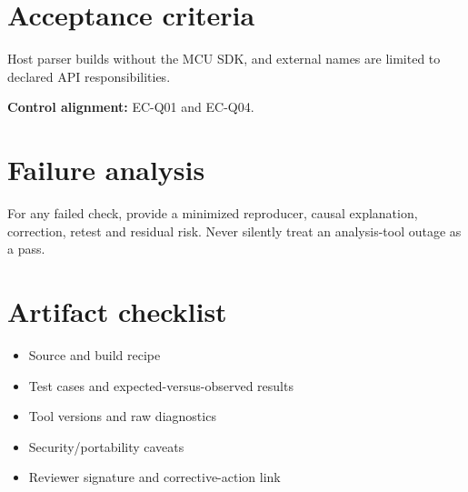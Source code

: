 \documentclass[10pt,letterpaper]{article}
\begin{document}
\section{Acceptance criteria}
Host parser builds without the MCU SDK, and external names are limited to declared API responsibilities.

\textbf{Control alignment:} EC-Q01 and EC-Q04.
\section{Failure analysis}
For any failed check, provide a minimized reproducer, causal explanation, correction, retest and residual risk. Never silently treat an analysis-tool outage as a pass.
\section{Artifact checklist}
\begin{itemize}
\item Source and build recipe
\item Test cases and expected-versus-observed results
\item Tool versions and raw diagnostics
\item Security/portability caveats
\item Reviewer signature and corrective-action link
\end{itemize}
\end{document}
